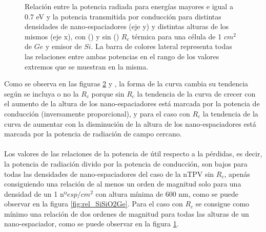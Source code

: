 \begin{figure}[H]
\begin{subfigure}[b]{0.49\textwidth}
			\label{fig:rel_SiSiO2Ge_Rc}
		\end{subfigure}
	\caption{\small Relación entre la potencia radiada para energías mayores e igual a 0.7 eV y la potencia transmitida por conducción para distintas densidades de nano-espaciadores (eje y) y distintas alturas de los mismos (eje x), con () y sin () $R_c$ térmica para una célula de 1 $cm^2$ de $Ge$ y emisor de $Si$. La barra de colores lateral representa todas las relaciones entre ambas potencias en el rango de los valores extremos que se muestran en la misma.
	}
	\label{fig:relation_SiSiO2Ge}
\end{figure}
Como se observa en las figuras \ref{fig:relation_SiSiO2Ge}  y , la forma de la curva cambia su tendencia según se incluya o no la $R_c$ porque sin $R_c$ la tendencia de la curva de crecer con el aumento de la altura de los nano-espaciadores está marcada por la potencia de conducción (inversamente proporcional), y para el caso con $R_c$ la  tendencia de la curva de aumentar con la disminución de la altura de los nano-espaciadores está marcada por la potencia de radiación de campo cercano.\\\\
Los valores de las relaciones de la potencia de útil respecto a la pérdidas, es decir, la potencia de radiación divido por la potencia de conducción, son bajos para todas las densidades de nano-espaciadores del caso de la nTPV sin $R_c$, apenás consiguiendo una relación de al menos un orden de magnitud solo para una densidad de un 1 nº$esp/cm^2$ con altura mínima de 600 nm, como se puede observar en la figura \ref{fig:rel_SiSiO2Ge}. Para el caso con $R_c$ se consigue como mínimo una relación de dos ordenes de magnitud para todas las alturas de un nano-espaciador, como se puede observar en la figura \ref{fig:rel_SiSiO2Ge_Rc}.\\\\
